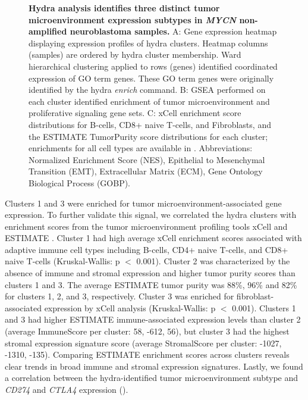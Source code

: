 \documentclass[10pt,letterpaper]{article}
\begin{document}
\begin{figure}[!h]
	\caption{{\bf Hydra analysis identifies three distinct tumor microenvironment expression subtypes in \textit{MYCN} non-amplified neuroblastoma samples.}
	A: Gene expression heatmap displaying expression profiles of hydra clusters. Heatmap columns (samples) are ordered by hydra cluster membership. Ward hierarchical clustering applied to rows (genes) identified coordinated expression of GO term genes. These GO term genes were originally identified by the hydra \textit{enrich} command. B: GSEA performed on each cluster identified enrichment of tumor microenvironment and proliferative signaling gene sets. C: xCell enrichment score distributions for B-cells, CD8+ naive T-cells, and Fibroblasts, and the ESTIMATE TumorPurity score distributions for each cluster; enrichments for all cell types are available in . Abbreviations: Normalized Enrichment Score (NES), Epithelial to Mesenchymal Transition (EMT), Extracellular Matrix (ECM), Gene Ontology Biological Process (GOBP).
	\label{MYCN-NA}}
\end{figure}

Clusters 1 and 3 were enriched for tumor microenvironment-associated gene expression. To further validate this signal, we correlated the hydra clusters with enrichment scores from the tumor microenvironment profiling tools xCell \cite{aranXCellDigitallyPortraying2017} and ESTIMATE \cite{yoshiharaInferringTumourPurity2013a}. Cluster 1 had high average xCell enrichment scores associated with adaptive immune cell types including B-cells, CD4+ naive T-cells, and CD8+ naive T-cells (Kruskal-Wallis: p $<$ 0.001). Cluster 2 was characterized by the absence of immune and stromal expression and higher tumor purity scores than clusters 1 and 3. The average ESTIMATE tumor purity was 88\%, 96\% and 82\% for clusters 1, 2, and 3, respectively. Cluster 3 was enriched for fibroblast-associated expression by xCell analysis (Kruskal-Wallis: p $<$ 0.001). Clusters 1 and 3 had higher ESTIMATE immune-associated expression levels than cluster 2 (average ImmuneScore per cluster: 58, -612, 56), but cluster 3 had the highest stromal expression signature score (average StromalScore per cluster: -1027, -1310, -135). Comparing ESTIMATE enrichment scores across clusters reveals clear trends in broad immune and stromal expression signatures. Lastly, we found a correlation between the hydra-identified tumor microenvironment subtype and \textit{CD274} and \textit{CTLA4} expression ().
\end{document}
